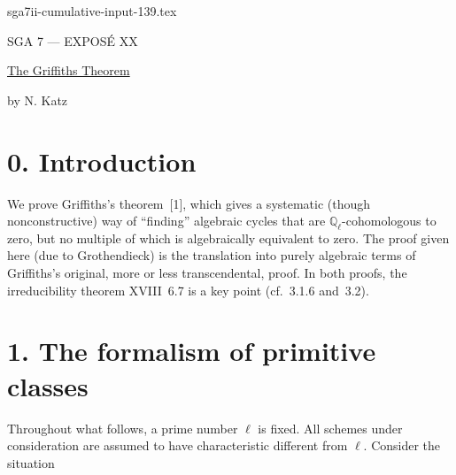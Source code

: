 \begin{filecontents*}{sga7ii-cumulative-input-139.tex}
\clearpage
\begin{center}
{\large SGA 7 --- EXPOS\'E XX}\par
\vspace{2em}
{\Large\underline{The Griffiths Theorem}}\par
\vspace{1.5em}
{\large by N. Katz}
\end{center}

\section*{0. Introduction}

We prove Griffiths's theorem~[1], which gives a systematic (though
nonconstructive) way of ``finding'' algebraic cycles that are
$\mathbb Q_\ell$-cohomologous to zero, but no multiple of which is
algebraically equivalent to zero.  The proof given here (due to
Grothendieck) is the translation into purely algebraic terms of Griffiths's
original, more or less transcendental, proof.  In both proofs, the
irreducibility theorem XVIII~6.7 is a key point (cf.~3.1.6 and~3.2).

\section*{1. The formalism of primitive classes}

Throughout what follows, a prime number $\ell$ is fixed.  All schemes under
consideration are assumed to have characteristic different from $\ell$.
Consider the situation


\end{filecontents*}
